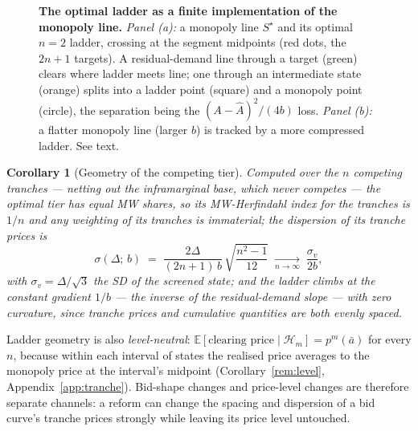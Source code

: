 \documentclass[11pt,a4paper]{article}
\newtheorem{corollary}{Corollary}
\theoremstyle{definition}
\theoremstyle{remark}
\theoremstyle{plain}
\begin{document}
\begin{figure}[H]
\begin{subfigure}[t]{0.49\textwidth}
\end{subfigure}
\caption{\textbf{The optimal ladder as a finite implementation of the monopoly line.} \emph{Panel (a):} a monopoly line $S^\star$ and its optimal $n{=}2$ ladder, crossing at the segment midpoints (red dots, the $2n+1$ targets). A residual-demand line through a target (green) clears where ladder meets line; one through an intermediate state (orange) splits into a ladder point (square) and a monopoly point (circle), the separation being the $(A-\hat A)^2/(4b)$ loss. \emph{Panel (b):} a flatter monopoly line (larger $b$) is tracked by a more compressed ladder. See text.}
\label{fig:ladder-quantizer}
\end{figure}


\begin{corollary}[Geometry of the competing tier]\label{cor:stats}
Computed over the $n$ competing tranches --- netting out the inframarginal base, which never competes --- the optimal tier has equal MW shares, so its MW-Herfindahl index for the tranches is $1/n$ and any weighting of its tranches is immaterial; the dispersion of its tranche prices is
\[
\sigma(\Delta;\, b) \;=\; \frac{2\Delta}{(2n+1)\, b}\,\sqrt{\frac{n^2 - 1}{12}}
\;\xrightarrow[n \to \infty]{}\; \frac{\sigma_v}{2b},
\]
with $\sigma_v = \Delta/\sqrt{3}$ the SD of the screened state; and the ladder climbs at the constant gradient $1/b$ --- the inverse of the residual-demand slope --- with zero curvature, since tranche prices and cumulative quantities are both evenly spaced.
\end{corollary}

Ladder geometry is also \emph{level-neutral}: $\mathbb{E}[\text{clearing price} \mid \mathcal{H}_m] = p^m(\bar a)$ for every $n$, because within each interval of states the realised price averages to the monopoly price at the interval's midpoint (Corollary~\ref{rem:level}, Appendix~\ref{app:tranche}). Bid-shape changes and price-level changes are therefore separate channels: a reform can change the spacing and dispersion of a bid curve's tranche prices strongly while leaving its price level untouched.
\end{document}
